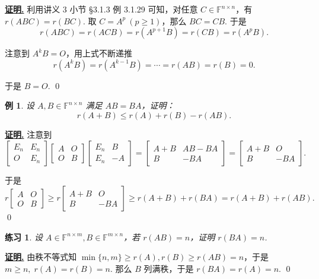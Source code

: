 \documentclass[10pt,openany]{article}
\theoremstyle{thmstyle} %
\newtheorem{practice}{练习}[section]
\theoremstyle{defstyle} %
\theoremstyle{prostyle} %
\theoremstyle{exastyle}
\newtheorem{example}[theorem]{例}
\theoremstyle{remstyle}
\renewenvironment{proof}[1][证明]{\par\underline{\textbf{#1.}} \;\fangsong}{\qed\par}
\newcommand{\F}{\mathbb{F}}
\newcommand{\n}{^{n \times n}}
\newcommand{\mn}{^{m \times n}}
\newcommand{\nm}{^{n \times m}}
\begin{document}
\begin{proof}
	利用讲义 3 小节 \S 3.1.3 例 3.1.29 可知，对任意 \( C \in \F\n \)，有 \( r(ABC)=r(BC) \). 取 \( C=A^p \ (p \geq 1) \)，那么 \( BC=CB \). 于是
	\[ r(ABC)=r(ACB)=r(A^{p+1}B)=r(CB)=r(A^pB). \] 
	
	注意到 \( A^kB=O \)，用上式不断递推
	\[ r(A^kB)=r(A^{k-1}B)=\cdots=r(AB)=r(B)=0. \]
	
	于是 \( B=O \).
\end{proof}

\begin{example}
	设 \( A,B \in \F\n \) 满足 \( AB=BA \)，证明：
	\[ r(A+B) \leq r(A)+r(B)-r(AB). \]
\end{example}

\begin{proof}
	注意到
	\[ \begin{bmatrix}
		E_n & E_n \\
		O & E_n
	\end{bmatrix}\begin{bmatrix}
		A & O \\
		O & B
	\end{bmatrix}\begin{bmatrix}
	E_n & B \\
	E_n & -A
	\end{bmatrix}=\begin{bmatrix}
	A+B & AB-BA \\
	B & -BA
	\end{bmatrix}=\begin{bmatrix}
	A+B & O \\
	B & -BA
	\end{bmatrix}. \]
	
	于是
	\[ r\begin{bmatrix}
		A & O \\
		O & B
	\end{bmatrix} \geq r\begin{bmatrix}
	A+B & O \\
	B & -BA
	\end{bmatrix} \geq r(A+B)+r(BA)=r(A+B)+r(AB). \]
\end{proof}

\begin{practice}
	设 \( A \in \F\nm, B \in \F\mn \)，若 \( r(AB)=n \)，证明 \( r(BA)=n \).
\end{practice}

\begin{proof}
	由秩不等式知 \( \min\{n,m\} \geq r(A), r(B) \geq r(AB)=n \)，于是 \( m \geq n, \; r(A)=r(B)=n \). 那么 \( B \) 列满秩，于是 \( r(BA)=r(A)=n \).
\end{proof}
\end{document}
